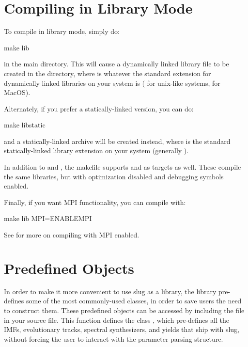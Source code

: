 \documentclass[letterpaper,10pt,english]{sphinxmanual}
\begin{document}
\section{Compiling in Library Mode}
\label{\detokenize{library:compiling-in-library-mode}}\label{\detokenize{library:ssec-library-mode}}
To compile in library mode, simply do:

\begin{sphinxVerbatim}[commandchars=\\\{\}]
make lib
\end{sphinxVerbatim}

in the main directory. This will cause a dynamically linked library
file  to be created in the  directory, where 
is whatever the standard extension for dynamically linked libraries on
your system is ( for unix-like systems,  for MacOS).

Alternately, if you prefer a statically-linked version, you can do:

\begin{sphinxVerbatim}[commandchars=\\\{\}]
make libstatic
\end{sphinxVerbatim}

and a statically-linked archive  will be created instead,
where  is the standard statically-linked library extension on
your system (generally ).

In addition to  and , the makefile supports
 and  as targets as well. These
compile the same libraries, but with optimization disabled and
debugging symbols enabled.

Finally, if you want MPI functionality, you can compile with:

\begin{sphinxVerbatim}[commandchars=\\\{\}]
make lib MPI=ENABLE\PYGZus{}MPI
\end{sphinxVerbatim}

See {\hyperref[\detokenize{compiling:ssec-compiling}]{}} for more on compiling with MPI enabled.


\section{Predefined Objects}
\label{\detokenize{library:ssec-predefined-objects}}\label{\detokenize{library:predefined-objects}}
In order to make it more convenient to use slug as a library, the
library pre-defines some of the most commonly-used classes, in order
to save users the need to construct them. These predefined objects can
be accessed by including the file  in your source
file. This function defines the class , which
pre-defines all the IMFs, evolutionary tracks, spectral synthesizers,
and yields that ship with slug, without forcing the user to interact
with the parameter parsing structure.
\end{document}
